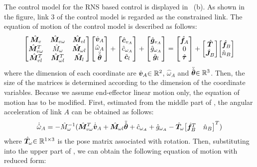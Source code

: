 The control model for the RNS based control is displayed in ~(b).
As shown in the figure,
link 3 of the control model is regarded as the constrained link.
The equation of motion of the control model is described as follows:
%
\begin{align}
  {\begin{bmatrix} {\hat{\bm{M}}}_{v} & {\hat{\bm{M}}}_{v\omega} & {\hat{\bm{M}}}_{vl}\\
    {\hat{\bm{M}}}_{v\omega}^{T} & \hat{M}_{\omega} & {\hat{\bm{M}}}_{\omega l}\\
    {\hat{\bm{M}}}_{vl}^{T} & {\hat{\bm{M}}}_{\omega l}^{T} & {\hat{\bm{M}}}_{l} \end{bmatrix}}
  {\begin{bmatrix} {\hat{\bm{v}}}_{A} \\ \hat{\omega}_{A} \\ {\ddot{\hat{\bm{\theta}}}}\end{bmatrix}}
  +
  {\begin{bmatrix} {\hat{\bm{c}}}_{v_{A}} \\ \hat{c}_{\omega_{A}} \\ {\hat{\bm{c}}}_{l} \end{bmatrix}}
  +
  {\begin{bmatrix} {\hat{\bm{g}}}_{v_{A}} \\ \hat{g}_{\omega_{A}} \\ {\hat{\bm{g}}}_{l} \end{bmatrix}}
  =
  {\begin{bmatrix} {\hat{\bm{f}}}_{A} \\ 0 \\ {\hat{\bm{\tau}}} \end{bmatrix}}
  +
  {\begin{bmatrix} {\hat{\bm{T}}} \\ {\hat{\bm{J}}}_{B} \end{bmatrix}}{\begin{bmatrix} {\hat{\bm{f}}}_{B} \\ \hat{n}_{B} \end{bmatrix}}
  \label{eq:EOM_MF_3R}
\end{align}
%
where the dimension of each coordinate are $\hat{\bm{v}}_{A}{\in\mathbb{R}^{2}}$,
$\hat{\omega}_{A}$ and ${\ddot{\hat{\bm{\theta}}}}{\in\mathbb{R}^{3}}$.
Then, the size of the matrices is determined according to the dimension of the coordinate variables.
Because we assume end-effector linear motion only,
the equation of motion has to be modified.
First, estimated from the middle part of ,
the angular acceleration of link $A$ can be obtained as follows:
%
\begin{align}
  \dot{\hat{\omega}}_{A} = -\hat{M}_{\omega}^{-1}({\hat{\bm{M}}}_{v\omega}^{T}\dot{{\hat{\bm{v}}}}_{A} + {\hat{\bm{M}}}_{\omega l}{\ddot{\hat{\bm{\theta}}}} + \hat{c}_{\omega_{A}}
  + \hat{g}_{\omega_{A}} - {\hat{\bm{T}}}_{\omega}{\begin{bmatrix} {\hat{\bm{f}}}_{B}^{T} & \hat{n}_{B} \end{bmatrix}}^{T})\label{eq:3R_ROT}
\end{align}
%
where ${\hat{\bm{T}}}_{\omega}{\in\mathbb{R}^{1 \times 3}}$ is the pose matrix associated with rotation.
Then, substituting  into the upper part of ,
we can obtain the following equation of motion with reduced form:
